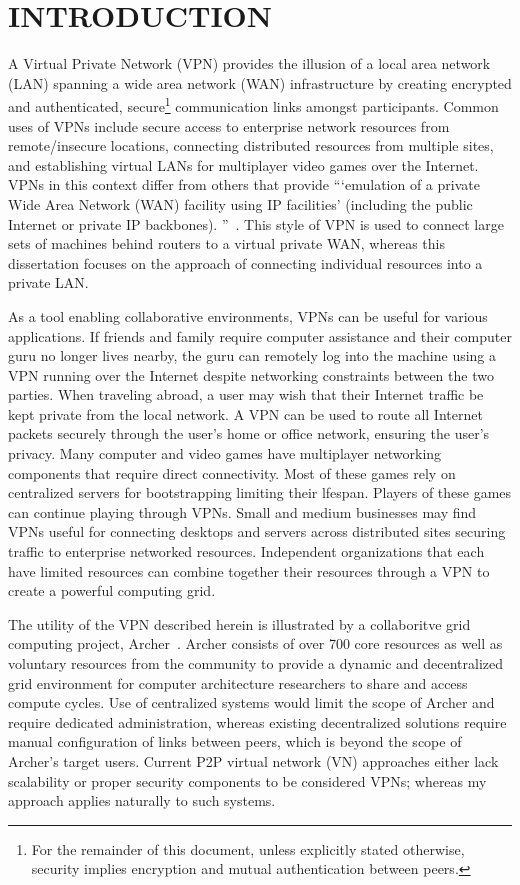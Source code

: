\chapter{INTRODUCTION}
\label{introduction}

A Virtual Private Network (VPN) provides the illusion of a local area network
(LAN) spanning a wide area network (WAN) infrastructure by creating encrypted
and authenticated, secure\footnote{For the remainder of this document, unless
explicitly stated otherwise, security implies encryption and mutual
authentication between peers.} communication links amongst participants.
Common uses of VPNs include secure access to enterprise network resources from
remote/insecure locations, connecting distributed resources from multiple
sites, and establishing virtual LANs for multiplayer video games over the
Internet.  VPNs in this context differ from others that provide ```emulation of
a private Wide Area Network (WAN) facility using IP facilities' (including the
public Internet or private IP backbones).  ''~\cite{ip_vpns}.  This style of
VPN is used to connect large sets of machines behind routers to a virtual
private WAN, whereas this dissertation focuses on the approach of connecting
individual resources into a private LAN.

As a tool enabling collaborative environments, VPNs can be useful for various
applications.  If friends and family require computer assistance and their
computer guru no longer lives nearby, the guru can remotely log into the
machine using a VPN running over the Internet despite networking constraints
between the two parties.  When traveling abroad, a user may wish that their
Internet traffic be kept private from the local network.  A VPN can be used to
route all Internet packets securely through the user's home or office network,
ensuring the user's privacy.  Many computer and video games have multiplayer
networking components that require direct connectivity.  Most of these games
rely on centralized servers for bootstrapping limiting their lfespan.  Players
of these games can continue playing through VPNs.  Small and medium businesses
may find VPNs useful for connecting desktops and servers across distributed
sites securing traffic to enterprise networked resources.  Independent
organizations that each have limited resources can combine together their
resources through a VPN to create a powerful computing grid.

The utility of the VPN described herein is illustrated by a collaboritve grid
computing project, Archer~\cite{archer}.  Archer consists of over 700 core
resources as well as voluntary resources from the community to provide a
dynamic and decentralized grid environment for computer architecture
researchers to share and access compute cycles.  Use of centralized systems
would limit the scope of Archer and require dedicated administration, whereas
existing decentralized solutions require manual configuration of links between
peers, which is beyond the scope of Archer's target users.  Current P2P virtual
network (VN) approaches either lack scalability or proper security components
to be considered VPNs; whereas my approach applies naturally to such systems.


